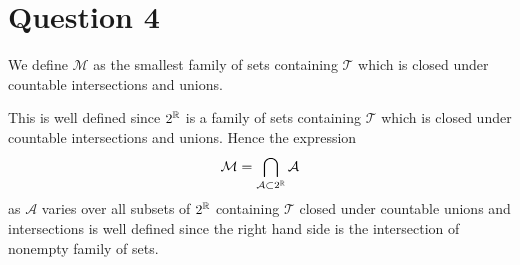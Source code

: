 \documentclass{unswmaths}
\begin{document}
\section*{Question 4}
We define $\mathcal{M}$ as the smallest family of sets containing $\mathcal{T}$
which is closed under countable intersections and unions.

This is well defined since $2^{\mathbb{R}}$ is a family of sets containing $\mathcal{T}$
which is closed under countable intersections and unions. Hence the expression
\begin{equation*}
    \mathcal{M} = \bigcap_{\mathcal{A}\subset 2^{\mathbb{R}}} \mathcal{A}
\end{equation*}
as $\mathcal{A}$ varies over all subsets of $2^{\mathbb{R}}$ containing $\mathcal{T}$
closed under countable unions and intersections is well defined since the right hand
side is the intersection of nonempty family of sets.
\end{document}
